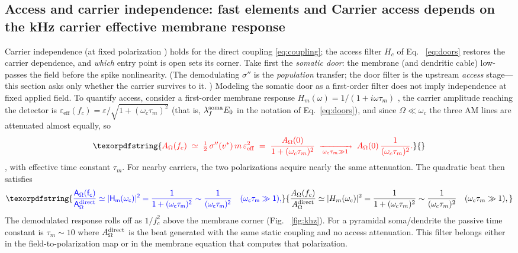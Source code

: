 \documentclass[11pt,a4paper]{article}
\newcommand{\Sig}{\sigma}
\newcommand{\half}{\tfrac{1}{2}}
\providecommand{\DIFaddtex}[1]{{\protect\color{blue} \sf #1}} %
\providecommand{\DIFdeltex}[1]{{\protect\color{red} \scriptsize #1}} %
\providecommand{\DIFaddbegin}{} %
\providecommand{\DIFaddend}{} %
\providecommand{\DIFdelbegin}{} %
\providecommand{\DIFdelend}{} %
\providecommand{\DIFadd}[1]{\texorpdfstring{\DIFaddtex{#1}}{#1}} %
\providecommand{\DIFdel}[1]{\texorpdfstring{\DIFdeltex{#1}}{}} %
\begin{document}
\subsection{\DIFdelbegin \DIFdel{Access and carrier independence: fast elements and }\DIFdelend \DIFaddbegin \DIFadd{Carrier access depends on }\DIFaddend the \DIFdelbegin \DIFdel{kHz carrier}\DIFdelend \DIFaddbegin \DIFadd{effective membrane response}\DIFaddend }\label{sec:khz}
Carrier independence \DIFdelbegin \DIFdel{(}\DIFdelend at fixed polarization \DIFdelbegin \DIFdel{) holds for the direct coupling \eqref{eq:coupling}; the
access filter $H_c$ of Eq. ~\eqref{eq:doors} restores the carrier dependence, and \emph{which} entry
point is open sets its corner.
Take first the \emph{somatic door}: the membrane (and dendritic cable)
low-passes the field before the spike nonlinearity.
(The demodulating $\Sig''$ is the \emph{population}
transfer; the door filter is the upstream \emph{access} stage---this section asks only whether the
carrier survives to it. ) Modeling the somatic door as a first-order filter }\DIFdelend \DIFaddbegin \DIFadd{does not imply independence at fixed
applied field. To quantify access, consider a first-order membrane response
}\DIFaddend $H_m(\omega)=1/(1+i\omega\tau_m)$\DIFdelbegin \DIFdel{, the carrier amplitude reaching the detector is
$\varepsilon_{\mathrm{eff}}(f_c)=\varepsilon/\sqrt{1+(\omega_c\tau_m)^2}$ (that is,
$\lambda^{\rm soma}_f E_0$ in the notation of Eq.~\eqref{eq:doors}), and
since $\Omega\ll\omega_c$ the three AM lines are attenuated almost equally, so
}\begin{displaymath}
\DIFdel{A_\Omega(f_c)\;\simeq\;\half\,\Sig''(v^*)\,m\,\varepsilon_{\mathrm{eff}}^2
\;=\;\frac{A_\Omega(0)}{1+(\omega_c\tau_m)^2}\;\xrightarrow[\ \omega_c\tau_m\gg1\ ]{}\;
A_\Omega(0)\,\frac{1}{(\omega_c\tau_m)^2}.
}\end{displaymath}%
\DIFdelend \DIFaddbegin \DIFadd{, with effective time constant $\tau_m$.
For nearby carriers, the two polarizations acquire nearly the same attenuation.
The quadratic beat then satisfies
}\begin{equation}
\DIFadd{\frac{A_\Omega(f_c)}{A_\Omega^{\rm direct}}
\simeq |H_m(\omega_c)|^2
=\frac{1}{1+(\omega_c\tau_m)^2}
\sim\frac{1}{(\omega_c\tau_m)^2}
\quad(\omega_c\tau_m\gg1),
\label{eq:khz}
}\end{equation}\DIFaddend
\DIFdelbegin \DIFdel{The demodulated response rolls off as $1/f_c^2$ above the membrane corner
(Fig.
~\ref{fig:khz}). For a pyramidal soma/dendrite the passive time constant is
$\tau_m\!\sim\!10$}\DIFdelend \DIFaddbegin \DIFadd{where $A_\Omega^{\rm direct}$ is the beat generated with the same static coupling
and no access attenuation. This filter belongs either in the field-to-polarization
map or in the membrane equation that computes that polarization.
}
\end{document}
